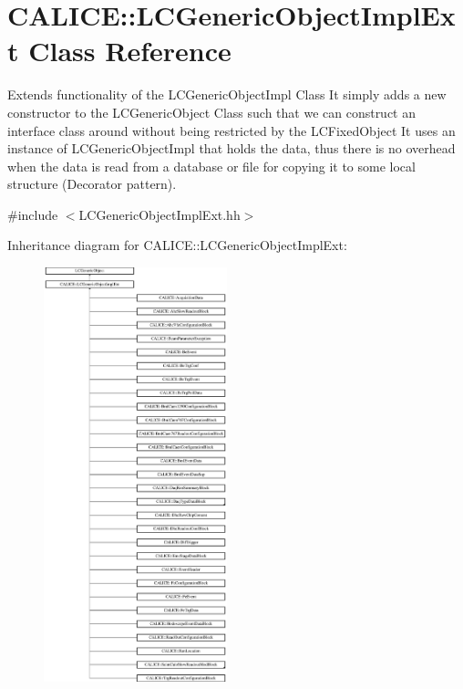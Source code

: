 \section{C\-A\-L\-I\-C\-E\-:\-:L\-C\-Generic\-Object\-Impl\-Ext Class Reference}
\label{classCALICE_1_1LCGenericObjectImplExt}


Extends functionality of the L\-C\-Generic\-Object\-Impl Class It simply adds a new constructor to the L\-C\-Generic\-Object Class such that we can construct an interface class around without being restricted by the L\-C\-Fixed\-Object It uses an instance of L\-C\-Generic\-Object\-Impl that holds the data, thus there is no overhead when the data is read from a database or file for copying it to some local structure (Decorator pattern).  




{\ttfamily \#include $<$L\-C\-Generic\-Object\-Impl\-Ext.\-hh$>$}

Inheritance diagram for C\-A\-L\-I\-C\-E\-:\-:L\-C\-Generic\-Object\-Impl\-Ext\-:\begin{figure}[H]
\begin{center}
\leavevmode
\includegraphics[height=12.000000cm]{classCALICE_1_1LCGenericObjectImplExt}
\end{center}
\end{figure}
